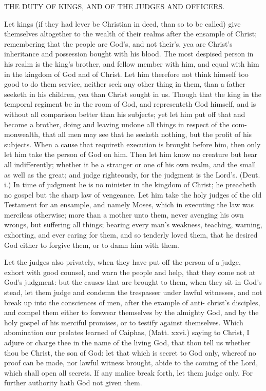 \documentclass{custom}
\begin{document}
THE DUTY OF KINGS, AND OF THE JUDGES 
AND OFFICERS. 

Let kings (if they had lever be Christian in deed, than 
so to be called) give themselves altogether to the wealth 
of their realms after the ensample of Christ; remembering 
that the people are God's, and not their's, yea are Christ's 
inheritance and possession bought with his blood. The 
most despised person in his realm is the king's brother, 
and fellow member with him, and equal with him in the 
kingdom of God and of Christ. Let him therefore not 
think himself too good to do them service, neither seek any 
other thing in them, than a father seeketh in his children, 
yea than Christ sought in us. Though that the king in the 
temporal regiment be in the room of God, and representeth 
God himself, and is without all comparison better than 
his subjects; yet let him put off that and become a brother, 
doing and leaving undone all things in respect of the com- 
monwealth, that all men may see that he seeketh nothing, 
but the profit of his subjects. When a cause that requireth 
execution is brought before him, then only let him take the 
person of God on him. Then let him know no creature 
but hear all indifferently; whether it be a stranger or one 
of his own realm, and the small as well as the great; and 
judge righteously, for the judgment is the Lord's. (Deut. 
i.) In time of judgment he is no minister in the kingdom 
of Christ; he preacheth no gospel but the sharp law 
of vengeance. Let him take the holy judges of the old 
Testament for an ensample, and namely Moses, which in 
executing the law was merciless otherwise; more than a 
mother unto them, never avenging his own wrongs, but 
suffering all things; bearing every man's weakness, teaching, 
warning, exhorting, and ever caring for them, and so 
tenderly loved them, that he desired God either to forgive 
them, or to damn him with them. 

Let the judges also privately, when they have put off 
the person of a judge, exhort with good counsel, and 
warn the people and help, that they come not at God's 
judgment: but the causes that are brought to them, 
when they sit in God's stead, let them judge and condemn 
the trespasser under lawful witnesses, and not break up 
into the consciences of men, after the example of anti- 
christ's disciples, and compel them either to forswear 
themselves by the almighty God, and by the holy gospel 
of his merciful promises, or to testify against themselves. 
Which abomination our prelates learned of Caiphas, 
(Matt. xxvi.) saying to Christ, I adjure or charge thee in 
the name of the living God, that thou tell us whether 
thou be Christ, the son of God: let that which is secret 
to God only, whereof no proof can be made, nor 
lawful witness brought, abide to the coming of the 
Lord, which shall open all secrets. If any malice break 
forth, let them judge only. For further authority hath 
God not given them. 
\end{document}
